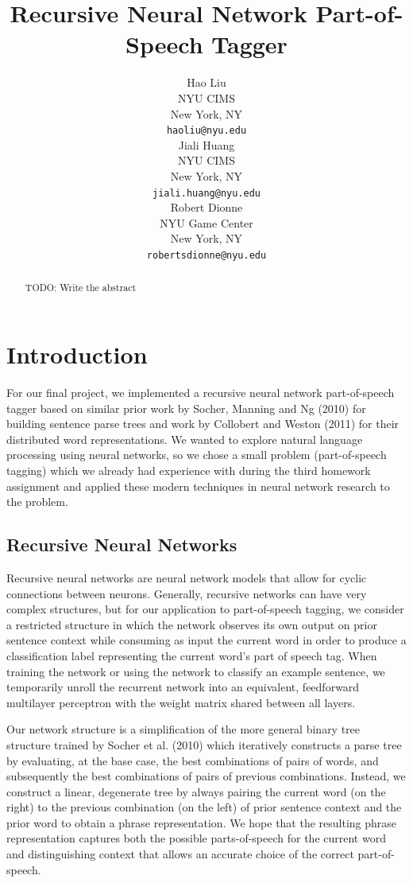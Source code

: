 \documentclass[11pt]{article}
\title{Recursive Neural Network Part-of-Speech Tagger}
\author{Hao Liu \\
  NYU CIMS \\
  New York, NY \\
  {\tt haoliu@nyu.edu} \\\And
  Jiali Huang \\
  NYU CIMS \\
  New York, NY \\
  {\tt jiali.huang@nyu.edu} \\\And
  Robert Dionne \\
  NYU Game Center \\
  New York, NY \\
  {\tt robertsdionne@nyu.edu} \\}
\date{}
\begin{document}
\maketitle
\begin{abstract}
  TODO: Write the abstract
\end{abstract}

\section{Introduction}

For our final project, we implemented a recursive neural network part-of-speech tagger based on similar prior work by Socher, Manning and Ng (2010) for building sentence parse trees and work by Collobert and Weston (2011) for their distributed word representations. We wanted to explore natural language processing using neural networks, so we chose a small problem (part-of-speech tagging) which we already had experience with during the third homework assignment and applied these modern techniques in neural network research to the problem.

\subsection{Recursive Neural Networks}

Recursive neural networks are neural network models that allow for cyclic connections between neurons. Generally, recursive networks can have very complex structures, but for our application to part-of-speech tagging, we consider a restricted structure in which the network observes its own output on prior sentence context while consuming as input the current word in order to produce a classification label representing the current word's part of speech tag. When training the network or using the network to classify an example sentence, we temporarily unroll the recurrent network into an equivalent, feedforward multilayer perceptron with the weight matrix shared between all layers.

Our network structure is a simplification of the more general binary tree structure trained by Socher et al. (2010) which iteratively constructs a parse tree by evaluating, at the base case, the best combinations of pairs of words, and subsequently the best combinations of pairs of previous combinations. Instead, we construct a linear, degenerate tree by always pairing the current word (on the right) to the previous combination (on the left) of prior sentence context and the prior word to obtain a phrase representation. We hope that the resulting phrase representation captures both the possible parts-of-speech for the current word and distinguishing context that allows an accurate choice of the correct part-of-speech.
\end{document}
